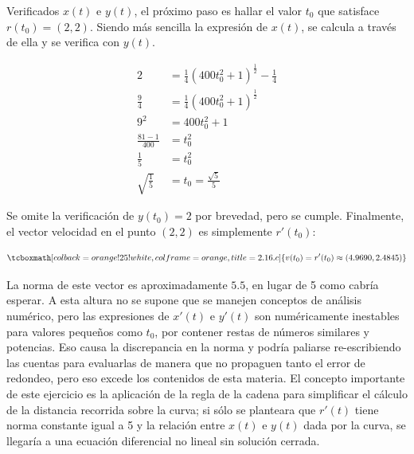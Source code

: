 \documentclass{article}
\begin{document}
Verificados $x(t)$ e $y(t)$, el próximo paso es hallar el valor $t_0$ que satisface $r(t_0) = (2, 2)$. Siendo más sencilla la expresión de $x(t)$, se calcula a través de ella y se verifica con $y(t)$.

\begin{align}
2 &= \frac{1}{4} (400 t_0^2 + 1)^{\frac{1}{2}} - \frac{1}{4} \\
\frac{9}{4} &= \frac{1}{4} (400 t_0^2 + 1)^{\frac{1}{2}} \\
9^2 &= 400 t_0^2 + 1 \\
\frac{81-1}{400} &= t_0^2 \\
\frac{1}{5} &= t_0^2 \\
\sqrt{\frac{1}{5}} &= t_0 = \frac{\sqrt{5}}{5}
\end{align}

Se omite la verificación de $y(t_0) = 2$ por brevedad, pero se cumple. Finalmente, el vector velocidad en el punto $(2,2)$ es simplemente $r'(t_0)$:

\begin{equation}
\tcboxmath[colback=orange!25!white,colframe=orange,title=2.16.c]
{
v(t_0) = r'(t_0) \approx (4.9690, 2.4845)
}
\end{equation}

La norma de este vector es aproximadamente $5.5$, en lugar de 5 como cabría esperar. A esta altura no se supone que se manejen conceptos de análisis numérico, pero las expresiones de $x'(t)$ e $y'(t)$ son numéricamente inestables para valores pequeños como $t_0$, por contener restas de números similares y potencias. Eso causa la discrepancia en la norma y podría paliarse re-escribiendo las cuentas para evaluarlas de manera que no propaguen tanto el error de redondeo, pero eso excede los contenidos de esta materia. El concepto importante de este ejercicio es la aplicación de la regla de la cadena para simplificar el cálculo de la distancia recorrida sobre la curva; si sólo se planteara que $r'(t)$ tiene norma constante igual a 5 y la relación entre $x(t)$ e $y(t)$ dada por la curva, se llegaría a una ecuación diferencial no lineal sin solución cerrada.
\end{document}
